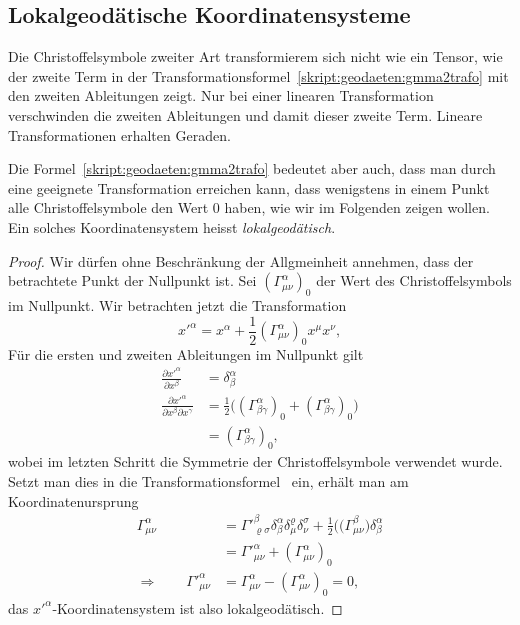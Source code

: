 \subsection{Lokalgeodätische Koordinatensysteme}
Die Christoffelsymbole zweiter Art transformierem sich nicht
wie ein Tensor, wie der zweite Term
in der Transformationsformel~\eqref{skript:geodaeten:gmma2trafo}
mit den zweiten Ableitungen zeigt.
Nur bei einer linearen Transformation verschwinden die zweiten Ableitungen
und damit dieser zweite Term.
Lineare Transformationen erhalten Geraden.

Die Formel~\eqref{skript:geodaeten:gmma2trafo}
bedeutet aber auch, dass man durch eine geeignete Transformation
erreichen kann, dass wenigstens in einem Punkt alle Christoffelsymbole
den Wert $0$ haben, wie wir im Folgenden zeigen wollen.
Ein solches Koordinatensystem heisst {\em lokalgeodätisch}.
%


\begin{proof}
Wir dürfen ohne Beschränkung der Allgmeinheit annehmen, dass der betrachtete
Punkt der Nullpunkt ist.
Sei $(\Gamma^\alpha_{\mu\nu})_0$ der Wert des Christoffelsymbols im
Nullpunkt.
Wir betrachten jetzt die Transformation
\[
x'^\alpha = x^\alpha + \frac12(\Gamma^\alpha_{\mu\nu})_0x^\mu x^\nu,
\]
Für die ersten und zweiten Ableitungen im Nullpunkt gilt
\begin{align*}
\frac{\partial x'^\alpha}{\partial x^\beta}
&=
\delta^\alpha_\beta
\\
\frac{\partial x'^\alpha}{\partial x^\beta\partial x^\gamma}
&=
\frac12\bigl(
(\Gamma^\alpha_{\beta\gamma})_0 + (\Gamma^\alpha_{\beta\gamma})_0
\bigr)
\\
&=
(\Gamma^\alpha_{\beta\gamma})_0,
\end{align*}
wobei im letzten Schritt die Symmetrie der Christoffelsymbole verwendet wurde.
Setzt man dies in die
Transformationsformel~\label{skript:kruemmung:christoffeltransformation} ein,
erhält man am Koordinatenursprung
\begin{align*}
\Gamma^\alpha_{\mu\nu}
&=
\Gamma'^\beta_{\varrho\sigma}
\delta^\alpha_\beta
\delta^\varrho_\mu
\delta^\sigma_\nu
+
\frac12\bigl(
(\Gamma^\beta_{\mu\nu}
\bigr)
\delta^\alpha_\beta
\\
&=
\Gamma'^\alpha_{\mu\nu}
+
(\Gamma^\alpha_{\mu\nu})_0
\\
\Rightarrow\qquad
\Gamma'^\alpha_{\mu\nu}
&=
\Gamma^\alpha_{\mu\nu}
-
(\Gamma^\alpha_{\mu\nu})_0
=0,
\end{align*}
das $x'^\alpha$-Koordinatensystem ist also lokalgeodätisch.
\end{proof}

